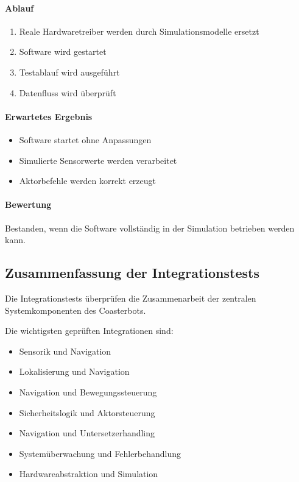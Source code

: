 \documentclass[
  a4paper,
  12pt,
  DIV=12,        %
  parskip=half,  %
  headings=small %
]{scrartcl}
\theoremstyle{definition}
\providecommand{\tightlist}{%
  \setlength{\itemsep}{0pt}\setlength{\parskip}{0pt}}
\theoremstyle{definition}
\begin{document}
\paragraph{Ablauf}\label{ablauf-15}

\begin{enumerate}
\def\labelenumi{\arabic{enumi}.}
\tightlist
\item
  Reale Hardwaretreiber werden durch Simulationsmodelle ersetzt
\item
  Software wird gestartet
\item
  Testablauf wird ausgeführt
\item
  Datenfluss wird überprüft
\end{enumerate}

\paragraph{Erwartetes Ergebnis}\label{erwartetes-ergebnis-15}

\begin{itemize}
\tightlist
\item
  Software startet ohne Anpassungen
\item
  Simulierte Sensorwerte werden verarbeitet
\item
  Aktorbefehle werden korrekt erzeugt
\end{itemize}

\paragraph{Bewertung}\label{bewertung-15}

Bestanden, wenn die Software vollständig in der Simulation betrieben
werden kann.

\subsection{Zusammenfassung der
Integrationstests}\label{zusammenfassung-der-integrationstests}

Die Integrationstests überprüfen die Zusammenarbeit der zentralen
Systemkomponenten des Coasterbots.

Die wichtigsten geprüften Integrationen sind:

\begin{itemize}
\tightlist
\item
  Sensorik und Navigation
\item
  Lokalisierung und Navigation
\item
  Navigation und Bewegungssteuerung
\item
  Sicherheitslogik und Aktorsteuerung
\item
  Navigation und Untersetzerhandling
\item
  Systemüberwachung und Fehlerbehandlung
\item
  Hardwareabstraktion und Simulation
\end{itemize}
\end{document}
